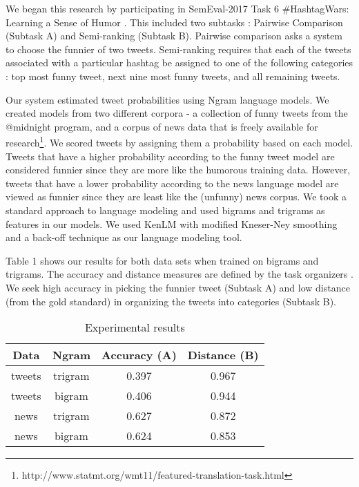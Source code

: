 \documentclass[11pt,a4paper]{article}
\begin{document}
We began this research by participating in SemEval-2017 Task 6 
\#HashtagWars: Learning a Sense of Humor \cite{PotashRR17}. This included
two subtasks : Pairwise Comparison (Subtask A) and Semi-ranking 
(Subtask B). Pairwise comparison asks a system to choose the funnier of
two tweets. Semi-ranking requires that each of the tweets
associated with a particular hashtag be assigned to one of the 
following categories : top most funny tweet, next nine most funny
tweets, and all remaining tweets. 


Our system
estimated tweet probabilities using Ngram language models.
We created models
from two different corpora - a collection of funny tweets from the @midnight
program, and a corpus of news data that is freely available for 
research\footnote{http://www.statmt.org/wmt11/featured-translation-task.html}. 
We scored tweets by assigning them a probability based on each 
model. Tweets that have a higher probability according to the funny 
tweet model are considered funnier since they are more like the humorous
training data. However, tweets 
that have a lower probability according to the news language model 
are viewed as funnier since they are least like the (unfunny) news corpus.
We took a standard approach to language modeling and used bigrams 
and trigrams as features in our models. We used KenLM \cite{Heafield-estimate} 
with modified Kneser-Ney smoothing and a back-off technique as our language 
modeling tool. 

Table 1 shows our results for both data sets when trained on 
bigrams and trigrams. The accuracy and distance measures
are defined by the task organizers \cite{PotashRR17}. We seek 
high accuracy in picking the funnier tweet (Subtask A) and low
distance (from the gold standard) in organizing the tweets into 
categories (Subtask B). 

\begin{table}[h]
\begin{center}
\begin{tabular}{cccc}
\hline
Data & Ngram & Accuracy (A) & Distance (B) \\
\hline
tweets & trigram & 0.397 & 0.967 \\
tweets & bigram & 0.406 & 0.944 \\
news & trigram & 0.627 & 0.872 \\
news & bigram & 0.624 & 0.853 \\
\end{tabular}
\caption{Experimental results}
\end{center}
\end{table}
\end{document}
